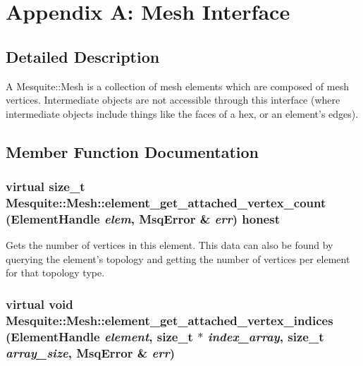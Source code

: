 \documentclass[letter]{report}
\begin{document}
\section{Appendix A: Mesh Interface}
\label{append_mesh}

\newcommand{\entrylabel}[1]{
   {\parbox[b]{\labelwidth-4pt}{\makebox[0pt][l]{\textbf{#1}}\\}}}
\newenvironment{Desc}
{\begin{list}{}
  {
    \settowidth{\labelwidth}{40pt}
    \setlength{\leftmargin}{\labelwidth}
    \setlength{\parsep}{0pt}
    \setlength{\itemsep}{-4pt}
    \renewcommand{\makelabel}{\entrylabel}
  }
}
{\end{list}}

\subsection{Detailed Description}
A Mesquite::Mesh is a collection of mesh elements which are composed of mesh vertices. Intermediate objects are not accessible through this interface (where intermediate objects include things like the faces of a hex, or an element's edges).

\subsection{Member Function Documentation}
\subsubsection{\setlength{\rightskip}{0pt plus 5cm}virtual size\_\-t Mesquite::Mesh::element\_\-get\_\-attached\_\-vertex\_\-count (Element\-Handle {\em elem}, {\bf Msq\-Error} \& {\em err}) honest\hspace{0.3cm}{\tt  [pure virtual]}}\label{classMesquite_1_1Mesh_a17}


Gets the number of vertices in this element. This data can also be found by querying the element's topology and getting the number of vertices per element for that topology type. 

\subsubsection{\setlength{\rightskip}{0pt plus 5cm}virtual void Mesquite::Mesh::element\_\-get\_\-attached\_\-vertex\_\-indices (Element\-Handle {\em element}, size\_\-t $\ast$ {\em index\_\-array}, size\_\-t {\em array\_\-size}, {\bf Msq\-Error} \& {\em err})\hspace{0.3cm}{\tt  [pure virtual]}}\label{classMesquite_1_1Mesh_a19}
\end{document}
